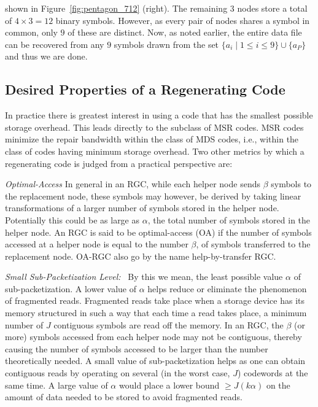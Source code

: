 \begin{multicols}{2}
\noindent
shown in Figure~\ref{fig:pentagon_712} (right).  The remaining $3$ nodes store a total of $4 \times 3=12$ binary symbols. However, as every pair of nodes shares a symbol in common, only $9$ of these are distinct.  Now, as noted earlier, the entire data file can be recovered from any $9$ symbols drawn from the set $\{a_i \mid 1 \leq i \leq 9\} \cup \{a_P\}$ and thus we are done. 

\subsection{Desired Properties of a Regenerating Code} 

In practice there is greatest interest in using a code that has the smallest possible storage overhead.  This leads directly to the subclass of MSR codes.  MSR codes minimize the repair bandwidth within the class of MDS codes, i.e., within the class of codes having minimum storage overhead.  Two other metrics by which a regenerating code is judged from a practical perspective are:
\ben
\item {\em Optimal-Access} In general in an RGC, while each helper node sends $\beta$ symbols to the replacement node, these symbols may however, be derived by taking linear transformations of a larger number of symbols stored in the helper node. Potentially this could be as large as $\alpha$, the total number of symbols stored in the helper node. An RGC is said to be optimal-access (OA) if the number of symbols accessed at a helper node is equal to the number $\beta$, of symbols transferred to the replacement node. OA-RGC also go by the name help-by-transfer RGC.  
\item {\em Small Sub-Packetization Level:} \ By this we mean, the least possible value $\alpha$ of sub-packetization.  A lower value of $\alpha$ helps reduce or eliminate the phenomenon of fragmented reads. Fragmented reads take place when a storage device has its memory structured in such a way that each time a read takes place, a minimum number of $J$ contiguous symbols are read off the memory.  In an RGC, the $\beta$ (or more) symbols accessed from each helper node may not be contiguous, thereby causing the number of symbols accessed to be larger than the number theoretically needed. A small value of sub-packetization helps as one can obtain contiguous reads by operating on several (in the worst case, $J$) codewords at the same time.  A large value of $\alpha$ would place a lower bound $\geq J(k \alpha)$ on the amount of data needed to be stored to avoid fragmented reads. 


\end{multicols}
